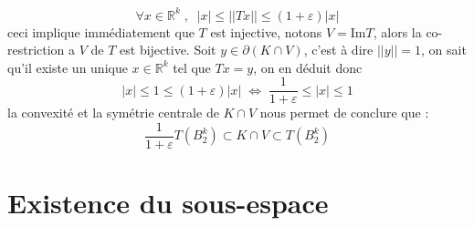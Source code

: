 \documentclass{report}
\begin{document}
\begin{enumerate}[leftmargin=\labelsep]
	\begin{equation*}
	\forall x \in \mathbb{R}^k \; , \;\; |x|\leq ||Tx||\leq (1+\varepsilon)|x|
	\end{equation*}
	ceci implique immédiatement que $T$ est injective, notons $V=\text{Im}T$, alors la co-restriction a $V$ de $T$ est bijective.
	Soit $y\in \partial(K\cap V)$, c'est à dire $||y||=1$, on sait qu'il existe un unique $x\in\mathbb{R}^k$ tel que $Tx=y$, on en déduit donc 
	\begin{equation*}
	|x|\leq 1 \leq (1+\varepsilon)|x|\; \iff\; \frac{1}{1+\varepsilon}\leq|x|\leq 1
	\end{equation*}
	la convexité et la symétrie centrale de $K\cap V$ nous permet de conclure que  :
	\begin{equation*}
		\frac{1}{1+\varepsilon}T(B_2^k)\subset K\cap V \subset T(B_2^k)
	\end{equation*}
\end{enumerate}
\newpage
\chapter*{Existence du sous-espace \hspace{1ex}\titlerule}
\end{document}
